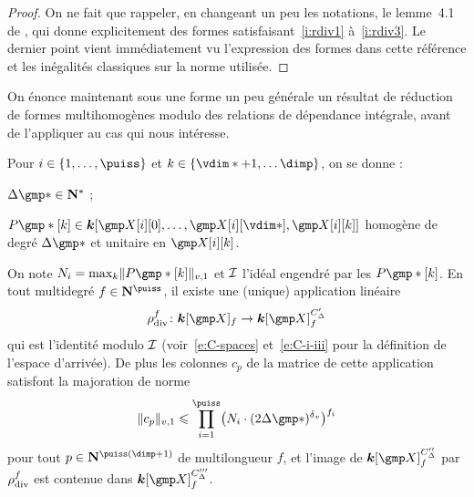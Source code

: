 \begin{proof} \later
  On ne fait que rappeler, en changeant un peu les notations, le lemme~4.1 de
  \cite{remivds}, qui donne explicitement des formes
  satisfaisant~\ref{i:rdiv1} à~\ref{i:rdiv3}. Le dernier point vient
  immédiatement vu l'expression des formes dans cette référence et les
  inégalités classiques sur la norme utilisée.
\end{proof}

On énonce maintenant sous une forme un peu générale un résultat de réduction
de formes multihomogènes modulo des relations de dépendance intégrale, avant
de l'appliquer au cas qui nous intéresse.

\begin{lem}
  Pour \( \fct \in \{ 1, \dots, \puiss \} \) et \( \ind \in \{ \vdim* + 1,
  \dots \dimp \} \), on se donne :
  \begin{enumthm}
    \item \( \Delta\mexp* \in \N^* \) ;
    \item \( P\mexp*[\ind]
      \in
      \cdn [ \cmh\fct[0], \dots, \cmh\fct[\vdim*], \cmh\fct[\ind] ] \)
      homogène de degré \( \Delta\mexp* \) et unitaire en \( \cmh\fct[\ind]
      \).
  \end{enumthm}
  On note \( N_\fct = \max_\ind \nv1 { P\mexp*[\ind] } \) et \( \mathcal I \)
  l'idéal engendré par les \( P\mexp*[\ind] \). En tout multidegré
  \( f \in \N^\puiss \), il existe une (unique) application linéaire
  \begin{equation}
    \rdiv^f \colon \cdn [\cmmh]_ f \to \cdn [\cmmh]_ f^{C'_\Delta}
  \end{equation}
  qui est l'identité modulo \( \mathcal I \) (voir~\ref{e:C-spaces}
  et~\ref{e:C-i-iii} pour la définition de l'espace d'arrivée). De plus les
  colonnes \( c_p \) de la matrice de cette application satisfont la majoration
  de norme
  \begin{equation}
    \nv1{c_p}
    \le
    \prod\fctrange \bigl(
    N_\fct \cdot (2 \Delta\mexp*)^\dv
    \bigr) ^{f_\fct}
  \end{equation}
  pour tout \( p \in \N^{\puiss(\dimp+1)} \) de multilongueur \( f \), et
  l'image de \( \cdn [\cmmh]_ f ^{C''_\Delta} \) par \( \rho_{\mathrm{div }}^f \) est
  contenue dans \( \cdn [\cmmh]_ f ^{C'''_\Delta} \).
\end{lem}

